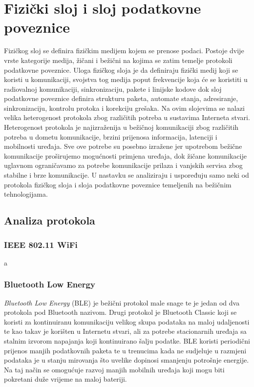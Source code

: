 \documentclass[times, utf8, diplomski]{fer}
\begin{document}
\section{Fizički sloj i sloj podatkovne poveznice}
 Fizičkog sloj se definira fizičkim medijem kojem se prenose podaci. Postoje dvije vrste kategorije medija, žičani i bežični na kojima se zatim temelje protokoli podatkovne poveznice. Uloga fizičkog sloja je da definiraju fizički medij koji se koristi u komunikaciji, svojstva tog medija poput frekvencije koja će se koristiti u radiovalnoj komunikaciji, sinkronizaciju, pakete i linijske kodove dok sloj podatkovne poveznice definira strukturu paketa, automate stanja, adresiranje, sinkronizaciju, kontrolu protoka i korekciju grešaka. Na ovim slojevima se nalazi velika heterogenost protokola zbog različitih potreba u sustavima Interneta stvari. Heterogenost protokola je najizraženija u bežičnoj komunikaciji zbog različitih potreba u dometu komunikacije, brzini prijenosa informacija, latenciji i mobilnosti uređaja. Sve ove potrebe su posebno izražene jer upotrebom bežične komunikacije proširujemo mogućnosti primjena uređaja, dok žičane komunikacije uglavnom ograničavamo za potrebe komunikacije prilaza i vanjskih servisa zbog stabilne i brze komunikacije. U nastavku se analiziraju i uspoređuju samo neki od protokola fizičkog sloja i sloja podatkovne poveznice temeljenih na bežičnim tehnologijama.

\subsection{Analiza protokola}
\subsubsection{IEEE 802.11 WiFi}
a

\subsubsection{Bluetooth Low Energy}
\emph{Bluetooth Low Energy} (BLE) je bežični protokol male snage te je jedan od dva protokola pod Bluetooth nazivom. Drugi protokol je Bluetooth Classic koji se koristi za kontinuiranu komunikaciju velikog skupa podataka na maloj udaljenosti te kao takav je korišten u Internetu stvari, ali za potrebe stacionarnih uređaja sa stalnim izvorom napajanja koji kontinuirano šalju podatke. BLE koristi periodični prijenos manjih podatkovnih paketa te u trenucima kada ne sudjeluje u razmjeni podataka je u stanju mirovanja što uvelike dopinosi smanjenju potrošnje energije. Na taj način se omogućuje razvoj manjih mobilnih uređaja koji mogu biti pokretani duže vrijeme na maloj bateriji. 
\end{document}
